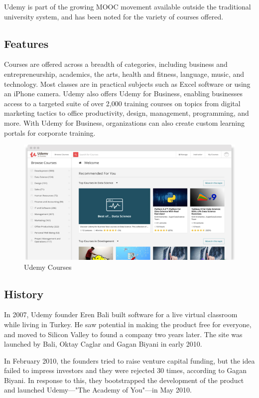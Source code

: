 Udemy is part of the growing MOOC movement available outside the traditional university system, and has been noted for the variety of courses offered.

\subsection{Features}

Courses are offered across a breadth of categories, including business and entrepreneurship, academics, the arts, health and fitness, language, music, and technology. Most classes are in practical subjects such as Excel software or using an iPhone camera. Udemy also offers Udemy for Business, enabling businesses access to a targeted suite of over 2,000 training courses on topics from digital marketing tactics to office productivity, design, management, programming, and more. With Udemy for Business, organizations can also create custom learning portals for corporate training.

\begin{figure}[h]
\label{ss}    %
\centering
\includegraphics[width= 13 cm]{udemydash.png}
\caption{Udemy Courses}
\end{figure}

\subsection{History}

In 2007, Udemy founder Eren Bali built software for a live virtual classroom while living in Turkey. He saw potential in making the product free for everyone, and moved to Silicon Valley to found a company two years later. The site was launched by Bali, Oktay Caglar and Gagan Biyani in early 2010.

In February 2010, the founders tried to raise venture capital funding, but the idea failed to impress investors and they were rejected 30 times, according to Gagan Biyani. In response to this, they bootstrapped the development of the product and launched Udemy—"The Academy of You"—in May 2010.

